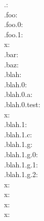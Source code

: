 \documentclass{article}
\begin{document}
\small
\noindent
.: \data\\
.foo: \data[foo]\\
.foo.0: \data[foo][0]\\
.foo.1: \data[foo][1]\\
x: \data[foo][2]\\
.bar: \data[bar]\\
.baz: \data[baz]\\
.blah: \data[blah]\\
.blah.0: \data[blah][0]\\
.blah.0.a: \data[blah][0][a]\\
.blah.0.test: \data[blah][0][test]\\
x: \data[blah][0][not]\\
.blah.1: \data[blah][1]\\
.blah.1.c: \data[blah][1][c]\\
.blah.1.g: \data[blah][1][g]\\
.blah.1.g.0: \data[blah][1][g][0]\\
.blah.1.g.1: \data[blah][1][g][1]\\
.blah.1.g.2: \data[blah][1][g][2]\\
x: \data[blah][1][g][3]\\
x: \data[blah][1][not]\\
x: \data[blah][2]\\
x: \data[not]
\end{document}
